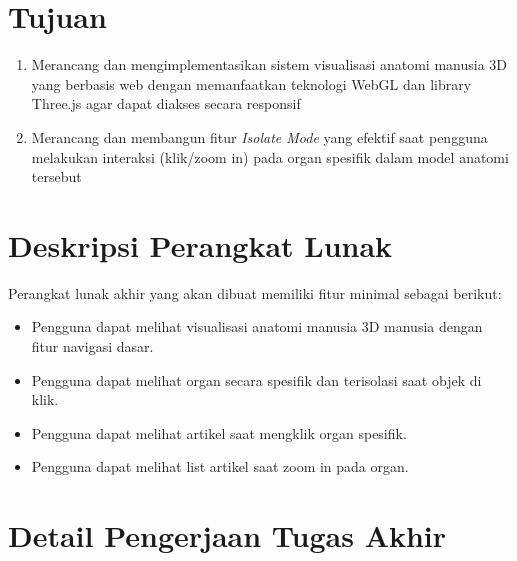 \documentclass[a4paper,twoside]{article}
\begin{document}
	\section{Tujuan}
    \begin{enumerate}
        \item Merancang dan mengimplementasikan sistem visualisasi anatomi manusia 3D yang berbasis web dengan memanfaatkan teknologi WebGL dan library Three.js agar dapat diakses secara responsif
        \item Merancang dan membangun fitur \textit{Isolate Mode} yang efektif saat pengguna melakukan interaksi (klik/zoom in) pada organ spesifik dalam model anatomi tersebut 
    \end{enumerate}

    
	
	\section{Deskripsi Perangkat Lunak}
	
	Perangkat lunak akhir yang akan dibuat memiliki fitur minimal sebagai berikut:
	\begin{itemize}
		\item Pengguna dapat melihat visualisasi anatomi manusia 3D manusia dengan fitur navigasi dasar.
        \item Pengguna dapat melihat organ secara spesifik dan terisolasi saat objek di klik.
        \item Pengguna dapat melihat artikel saat mengklik organ spesifik.
        \item Pengguna dapat melihat list artikel saat zoom in pada organ.
		
	\end{itemize}
	
	\section{Detail Pengerjaan Tugas Akhir}
\end{document}

